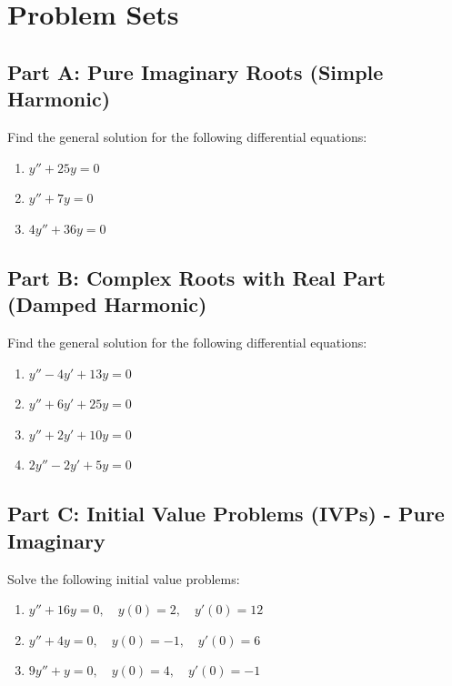 \documentclass[11pt]{article}
\begin{document}
\newpage

\section{Problem Sets}

\subsection*{Part A: Pure Imaginary Roots (Simple Harmonic)}
Find the general solution for the following differential equations:
\begin{enumerate}[label=\textbf{\arabic*.}]
    \item $y'' + 25y = 0$
    \item $y'' + 7y = 0$
    \item $4y'' + 36y = 0$
\end{enumerate}

\subsection*{Part B: Complex Roots with Real Part (Damped Harmonic)}
Find the general solution for the following differential equations:
\begin{enumerate}[label=\textbf{\arabic*.}, resume]
    \item $y'' - 4y' + 13y = 0$
    \item $y'' + 6y' + 25y = 0$
    \item $y'' + 2y' + 10y = 0$
    \item $2y'' - 2y' + 5y = 0$
\end{enumerate}

\subsection*{Part C: Initial Value Problems (IVPs) - Pure Imaginary}
Solve the following initial value problems:
\begin{enumerate}[label=\textbf{\arabic*.}, resume]
    \item $y'' + 16y = 0, \quad y(0) = 2, \quad y'(0) = 12$
    \item $y'' + 4y = 0, \quad y(0) = -1, \quad y'(0) = 6$
    \item $9y'' + y = 0, \quad y(0) = 4, \quad y'(0) = -1$
\end{enumerate}
\end{document}
